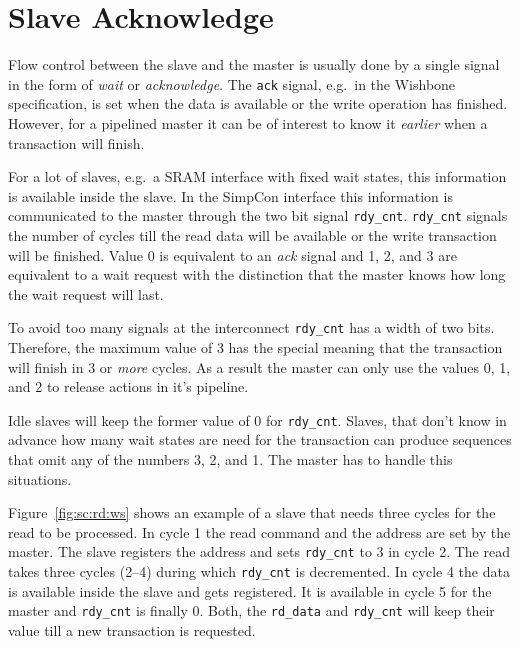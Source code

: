 \documentclass[a4paper,12pt]{scrartcl}
\newcommand{\sign}[1]{{\texttt{#1}}}
\begin{document}
\section{Slave Acknowledge}
\label{sec:ack}

Flow control between the slave and the master is usually done by a
single signal in the form of \emph{wait} or \emph{acknowledge}. The
\sign{ack} signal, e.g.\ in the Wishbone specification, is set when
the data is available or the write operation has finished. However,
for a pipelined master it can be of interest to know it
\emph{earlier} when a transaction will finish.

For a lot of slaves, e.g.\ a SRAM interface with fixed wait states,
this information is available inside the slave. In the SimpCon
interface this information is communicated to the master through the
two bit signal \sign{rdy\_cnt}. \sign{rdy\_cnt} signals the number
of cycles till the read data will be available or the write
transaction will be finished. Value 0 is equivalent to an \emph{ack}
signal and 1, 2, and 3 are equivalent to a wait request with the
distinction that the master knows how long the wait request will
last.

To avoid too many signals at the interconnect \sign{rdy\_cnt} has a
width of two bits. Therefore, the maximum value of 3 has the special
meaning that the transaction will finish in 3 or \emph{more} cycles.
As a result the master can only use the values 0, 1, and 2 to
release actions in it's pipeline.

Idle slaves will keep the former value of 0 for \sign{rdy\_cnt}.
Slaves, that don't know in advance how many wait states are need for
the transaction can produce sequences that omit any of the numbers
3, 2, and 1. The master has to handle this situations.

Figure~\ref{fig:sc:rd:ws} shows an example of a slave that needs
three cycles for the read to be processed. In cycle 1 the read
command and the address are set by the master. The slave registers
the address and sets \sign{rdy\_cnt} to 3 in cycle 2. The read takes
three cycles (2--4) during which \sign{rdy\_cnt} is decremented. In
cycle 4 the data is available inside the slave and gets registered.
It is available in cycle 5 for the master and \sign{rdy\_cnt} is
finally 0. Both, the \sign{rd\_data} and \sign{rdy\_cnt} will keep
their value till a new transaction is requested.
\end{document}
